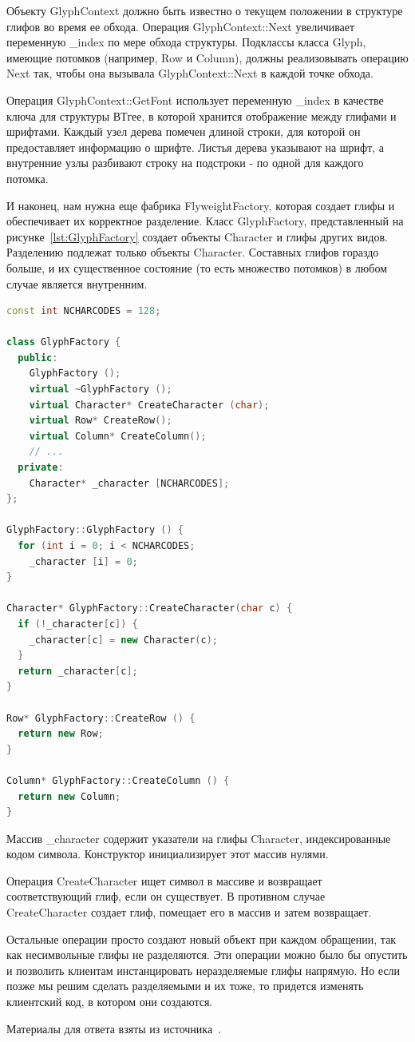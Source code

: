 Объекту GlyphContext должно быть известно о текущем положении в структуре
глифов во время ее обхода. Операция GlyphContext::Next увеличивает
переменную \_index по мере обхода структуры.
Подклассы класса Glyph, имеющие потомков (например, Row и Column),
должны реализовывать операцию Next так, чтобы она вызывала
GlyphContext::Next в каждой точке обхода.

Операция GlyphContext::GetFont использует переменную \_index в качестве
ключа для структуры ВТгее, в которой хранится отображение между глифами
и шрифтами. Каждый узел дерева помечен длиной строки, для которой он
предоставляет информацию о шрифте. Листья дерева указывают на шрифт, а внутренние
узлы разбивают строку на подстроки - по одной для каждого потомка.


И наконец, нам нужна еще фабрика FlyweightFactory, которая создает глифы и
обеспечивает их корректное разделение. Класс GlyphFactory, представленный 
на рисунке~\ref{lst:GlyphFactory} создает объекты Character и глифы других видов.
Разделению подлежат только объекты Character.
Составных глифов гораздо больше, и их существенное состояние
(то есть множество потомков) в любом случае является внутренним.

\begin{lstlisting}[float,language=c++,caption=Класс GlyphFactory,label=lst:GlyphFactory]
const int NCHARCODES = 128;

class GlyphFactory {
  public:
    GlyphFactory ();
    virtual ~GlyphFactory ();
    virtual Character* CreateCharacter (char);
    virtual Row* CreateRow();
    virtual Column* CreateColumn();
    // ...
  private:
    Character* _character [NCHARCODES];
};

GlyphFactory::GlyphFactory () {
  for (int i = 0; i < NCHARCODES;
    _character [i] = 0;
}

Character* GlyphFactory::CreateCharacter(char c) {
  if (!_character[c]) {
    _character[c] = new Character(c);
  }
  return _character[c];
}

Row* GlyphFactory::CreateRow () {
  return new Row;
}

Column* GlyphFactory::CreateColumn () {
  return new Column;
}
\end{lstlisting}

Массив \_character содержит указатели на глифы Character, индексированные
кодом символа. Конструктор инициализирует этот массив нулями.

Операция CreateCharacter ищет символ в массиве и возвращает соответствующий
глиф, если он существует. В противном случае CreateCharacter создает глиф,
помещает его в массив и затем возвращает.

Остальные операции просто создают новый объект при каждом обращении,
так как несимвольные глифы не разделяются. Эти операции можно было бы опустить
и позволить клиентам инстанцировать неразделяемые глифы напрямую.
Но если позже мы решим сделать разделяемыми и их тоже,
то придется изменять клиентский код, в котором они создаются.

Материалы для ответа взяты из источника~\cite{gamma01}.